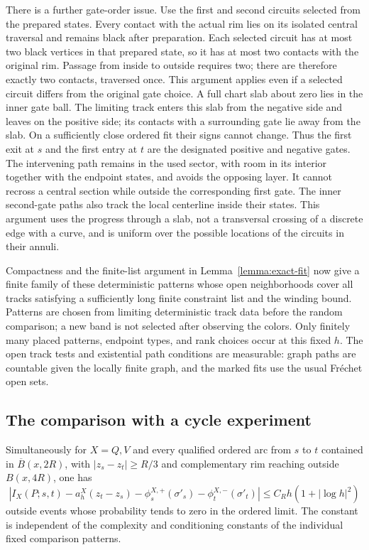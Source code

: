 There is a further gate-order issue.  Use the first and second
circuits selected from the prepared states.  Every contact with the
actual rim lies on its isolated central traversal and remains black
after preparation.  Each selected circuit has at most two black
vertices in that prepared state, so it has at most two contacts with
the original rim.  Passage from inside to outside requires two;
there are therefore exactly two contacts, traversed once.  This
argument applies even if a selected circuit differs from the
original gate choice.  A full chart slab about
zero lies in the inner gate ball.  The limiting track enters this
slab from the negative side and leaves on the positive side; its
contacts with a surrounding gate lie away from the slab.  On a
sufficiently close ordered fit their signs cannot change.  Thus the
first exit at $s$ and the first entry at $t$ are the designated
positive and negative gates.  The intervening path remains in the
used sector, with room in its interior together with the endpoint
states, and avoids the opposing layer.  It cannot recross a central
section while outside the corresponding first gate.  The inner
second-gate paths also track the local centerline inside their
states.  This argument uses the progress through a slab, not a
transversal crossing of a discrete edge with a curve, and is uniform
over the possible locations of the circuits in their annuli.

Compactness and the finite-list argument in
Lemma~\ref{lemma:exact-fit} now give a finite family of these
deterministic patterns whose open neighborhoods cover all tracks
satisfying a sufficiently long finite constraint list and the winding
bound.  Patterns are chosen from limiting deterministic track data
before the random comparison; a new band is not selected after
observing the colors.  Only finitely many placed patterns, endpoint
types, and rank choices occur at this fixed $h$.  The open track
tests and existential path conditions are measurable: graph paths
are countable given the locally finite graph, and the marked fits
use the usual Fr\'echet open sets.

\subsection{The comparison with a cycle experiment}

\begin{proposition}\label{prop:real-arc}
Simultaneously for $X=Q,V$ and every qualified ordered arc from $s$
to $t$ contained in $\overline B(x,2R)$, with
$|z_s-z_t|\ge R/3$ and complementary rim reaching outside
$B(x,4R)$, one has
\begin{equation}\label{actual:arc}
 \left|I_X(P;s,t)-a_h^X(z_t-z_s)
       -\phi_s^{X,+}(\sigma'_s)-\phi_t^{X,-}(\sigma'_t)\right|
       \le C_Rh(1+|\log h|^2)
\end{equation}
outside events whose probability tends to zero in the ordered limit.
The constant is independent of the complexity and conditioning
constants of the individual fixed comparison patterns.
\end{proposition}


